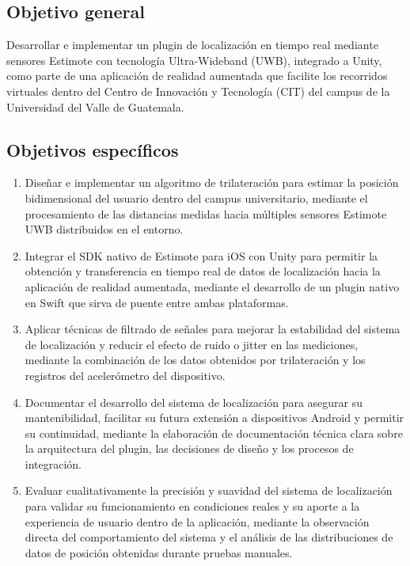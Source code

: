 \documentclass{article}
\begin{document}
\subsection{Objetivo general}
{\justify Desarrollar e implementar un plugin de localización en tiempo real mediante sensores Estimote con tecnología Ultra-Wideband (UWB), integrado a Unity, como parte de una aplicación de realidad aumentada que facilite los recorridos virtuales dentro del Centro de Innovación y Tecnología (CIT) del campus de la Universidad del Valle de Guatemala.}

\subsection{Objetivos específicos}
\begin{enumerate}[label=\thesubsection.\arabic*]
    \item Diseñar e implementar un algoritmo de trilateración
para estimar la posición bidimensional del usuario dentro del campus universitario,
mediante el procesamiento de las distancias medidas hacia múltiples sensores Estimote UWB distribuidos en el entorno.
    \item Integrar el SDK nativo de Estimote para iOS con Unity
para permitir la obtención y transferencia en tiempo real de datos de localización hacia la aplicación de realidad aumentada,
mediante el desarrollo de un plugin nativo en Swift que sirva de puente entre ambas plataformas.
    \item Aplicar técnicas de filtrado de señales
para mejorar la estabilidad del sistema de localización y reducir el efecto de ruido o jitter en las mediciones,
mediante la combinación de los datos obtenidos por trilateración y los registros del acelerómetro del dispositivo.
    \item Documentar el desarrollo del sistema de localización
para asegurar su mantenibilidad, facilitar su futura extensión a dispositivos Android y permitir su continuidad,
mediante la elaboración de documentación técnica clara sobre la arquitectura del plugin, las decisiones de diseño y los procesos de integración.
    \item Evaluar cualitativamente la precisión y suavidad del sistema de localización
para validar su funcionamiento en condiciones reales y su aporte a la experiencia de usuario dentro de la aplicación,
mediante la observación directa del comportamiento del sistema y el análisis de las distribuciones de datos de posición obtenidas durante pruebas manuales.       
\end{enumerate}
\end{document}
